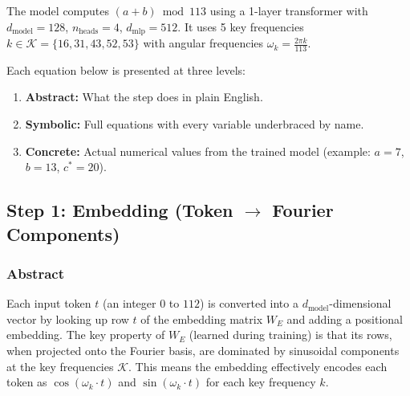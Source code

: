 \documentclass[11pt,a4paper]{article}
\begin{document}
The model computes $(a + b) \bmod 113$ using a 1-layer transformer with $d_{\text{model}} = 128$, $n_{\text{heads}} = 4$, $d_{\text{mlp}} = 512$. It uses 5 key frequencies $k \in \mathcal{K} = \{16, 31, 43, 52, 53\}$ with angular frequencies $\omega_k = \frac{2\pi k}{113}$.

Each equation below is presented at three levels:
\begin{enumerate}
  \item \textbf{Abstract:} What the step does in plain English.
  \item \textbf{Symbolic:} Full equations with every variable underbraced by name.
  \item \textbf{Concrete:} Actual numerical values from the trained model (example: $a = 7$, $b = 13$, $c^* = 20$).
\end{enumerate}

\subsection{Step 1: Embedding (Token $\to$ Fourier Components)}

\subsubsection*{Abstract}
Each input token $t$ (an integer $0$ to $112$) is converted into a $d_{\text{model}}$-dimensional vector by looking up row $t$ of the embedding matrix $W_E$ and adding a positional embedding. The key property of $W_E$ (learned during training) is that its rows, when projected onto the Fourier basis, are dominated by sinusoidal components at the key frequencies $\mathcal{K}$. This means the embedding effectively encodes each token as $\cos(\omega_k \cdot t)$ and $\sin(\omega_k \cdot t)$ for each key frequency $k$.
\end{document}
